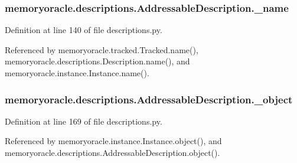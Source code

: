 \hypertarget{classmemoryoracle_1_1descriptions_1_1AddressableDescription_a6e606b2cd417f62a633e8388fe713815}{}
\subsubsection[{\+\_\+name}]{\setlength{\rightskip}{0pt plus 5cm}memoryoracle.\+descriptions.\+Addressable\+Description.\+\_\+name\hspace{0.3cm}{\ttfamily [private]}}\label{classmemoryoracle_1_1descriptions_1_1AddressableDescription_a6e606b2cd417f62a633e8388fe713815}


Definition at line 140 of file descriptions.\+py.



Referenced by memoryoracle.\+tracked.\+Tracked.\+name(), memoryoracle.\+descriptions.\+Description.\+name(), and memoryoracle.\+instance.\+Instance.\+name().

\hypertarget{classmemoryoracle_1_1descriptions_1_1AddressableDescription_a515398067787e3ea1a6c782d3b03e17d}{}
\subsubsection[{\+\_\+object}]{\setlength{\rightskip}{0pt plus 5cm}memoryoracle.\+descriptions.\+Addressable\+Description.\+\_\+object\hspace{0.3cm}{\ttfamily [private]}}\label{classmemoryoracle_1_1descriptions_1_1AddressableDescription_a515398067787e3ea1a6c782d3b03e17d}


Definition at line 169 of file descriptions.\+py.



Referenced by memoryoracle.\+instance.\+Instance.\+object(), and memoryoracle.\+descriptions.\+Addressable\+Description.\+object().

\hypertarget{classmemoryoracle_1_1descriptions_1_1AddressableDescription_afc0dda5186169a237d82c5de7cdafb8a}{}
